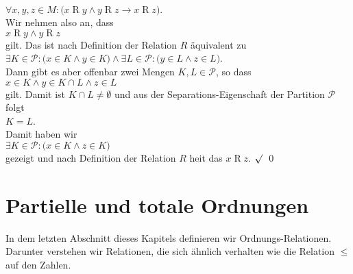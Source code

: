 \begin{enumerate}
      \\[0.2cm]
      \hspace*{1.3cm}
      $\forall x,y,z \in M:\bigl( x \mathop{R} y \wedge y \mathop{R} z \rightarrow x \mathop{R} z\bigr)$.
      \\[0.2cm]
      Wir nehmen also an, dass 
      \\[0.2cm]
      \hspace*{1.3cm}
      $x \mathop{R} y \wedge y \mathop{R} z$
      \\[0.2cm]
      gilt.  Das ist nach Definition der Relation $R$ \"{a}quivalent zu
      \\[0.2cm]
      \hspace*{1.3cm}
      $\exists K \in \mathcal{P}: \bigl(x \in K \wedge y \in K\bigr) \wedge 
       \exists L \in \mathcal{P}: \bigl(y \in L \wedge z \in L\bigr)$.
      \\[0.2cm]
      Dann gibt es aber offenbar zwei Mengen $K,L\in\mathcal{P}$, so dass
      \\[0.2cm]
      \hspace*{1.3cm}
      $x \in K \wedge y \in K \cap L \wedge z \in L$
      \\[0.2cm]
      gilt.  Damit ist $K \cap L \not= \emptyset$ und aus der 
      Separations-Eigenschaft der Partition $\mathcal{P}$ folgt 
      \\[0.2cm]
      \hspace*{1.3cm}
      $K = L$.
      \\[0.2cm]
      Damit haben wir 
      \\[0.2cm]
      \hspace*{1.3cm}
      $\exists K \in \mathcal{P}: \bigl(x \in K \wedge z \in K\bigr)$
      \\[0.2cm]
      gezeigt und nach Definition der Relation $R$ hei\3t das 
      $x \mathop{R} z$. $\surd$
      \qed
\end{enumerate}


\section{Partielle und totale Ordnungen}
In dem letzten Abschnitt dieses Kapitels definieren wir Ordnungs-Relationen.  Darunter verstehen wir
Relationen, die sich \"{a}hnlich verhalten wie die Relation $\leq$ auf den Zahlen.

